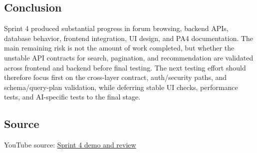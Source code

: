 \documentclass[12pt]{article}
\begin{document}
\subsection{Conclusion}

Sprint 4 produced substantial progress in forum browsing, backend APIs, database behavior, frontend integration, UI design, and PA4 documentation. The main remaining risk is not the amount of work completed, but whether the unstable API contracts for search, pagination, and recommendation are validated across frontend and backend before final testing. The next testing effort should therefore focus first on the cross-layer contract, auth/security paths, and schema/query-plan validation, while deferring stable UI checks, performance tests, and AI-specific tests to the final stage.

\subsection{Source}

YouTube source: \href{https://www.youtube.com/watch?v=l0PKjKdXL-s}{Sprint 4 demo and review}
\end{document}
